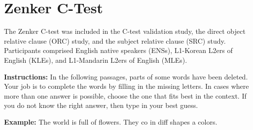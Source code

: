 
\chapter{Zenker C-Test}\label{app-zenker}

The Zenker C-test was included in the C-test validation study, the direct object relative clause (ORC) study, and the subject relative clause (SRC) study. Participants comprised English native speakers (ENSs), L1-Korean L2ers of English (KLEs), and L1-Mandarin L2ers of English (MLEs).

\vspace{0.5cm}

\textbf{Instructions:} In the following passages, parts of some words have been deleted. Your job is to complete the words by filling in the missing letters. In cases where more than one answer is possible, choose the one that fits best in the context. If you do not know the right answer, then type in your best guess.

\vspace{0.5 cm}

\textbf{Example:} The world is full of flowers. They co in diff shapes a colors.

\vspace{0.5 cm}


